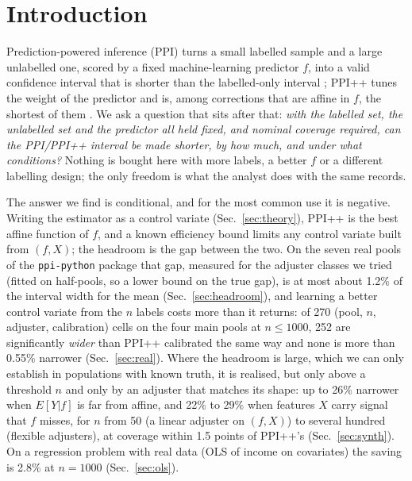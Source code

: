 \section{Introduction}
\label{sec:intro}
Prediction-powered inference (PPI) turns a small labelled sample and a large unlabelled one, scored by a fixed machine-learning predictor $f$, into a valid confidence interval that is shorter than the labelled-only interval
\citep{angelopoulos2023ppi}; PPI++ tunes the weight of the predictor and is, among corrections that are affine in $f$, the shortest of them \citep{angelopoulos2023ppiplus}.
We ask a question that sits after that: \emph{with the labelled set, the unlabelled set and the predictor all held fixed, and nominal coverage required, can the PPI/PPI++ interval be made shorter, by how much, and under what conditions?}
Nothing is bought here with more labels, a better $f$ or a different labelling design; the only freedom is what the analyst does with the same records.

The answer we find is conditional, and for the most common use it is negative. Writing the estimator as a control variate (Sec.~\ref{sec:theory}), PPI++ is the best affine function of $f$, and a known efficiency bound limits any control variate built from $(f,X)$; the headroom is the gap between the two.
On the seven real pools of the \texttt{ppi-python} package that gap, measured for the adjuster classes we tried (fitted on half-pools, so a lower bound on the true gap), is at most about 1.2\% of the interval width for the mean (Sec.~\ref{sec:headroom}), and learning a better control variate from the $n$ labels costs more than it returns:
of 270 (pool, $n$, adjuster, calibration) cells on the four main pools at $n\le1000$, 252 are significantly \emph{wider} than PPI++ calibrated the same way and none is more than 0.55\% narrower (Sec.~\ref{sec:real}).
Where the headroom is large, which we can only establish in populations with known truth, it is realised, but only above a threshold $n$ and only by an adjuster that matches its shape: up to 26\% narrower when $E[Y|f]$ is far from affine, and
22\% to 29\% when features $X$ carry signal that $f$ misses, for $n$ from 50 (a linear adjuster on $(f,X)$) to several hundred (flexible adjusters), at coverage within 1.5 points of PPI++'s (Sec.~\ref{sec:synth}). On a regression problem with real data (OLS of income on covariates) the saving is 2.8\% at $n=1000$ (Sec.~\ref{sec:ols}).

